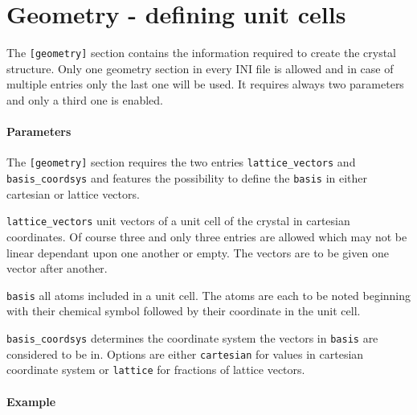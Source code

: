 \section{Geometry - defining unit cells} 
The \lstinline{[geometry]} section contains the information required to create the crystal structure. Only one geometry section in every INI file is allowed and in case of multiple entries only the last one will be used. It requires always two parameters and only a third one is enabled.

\paragraph{Parameters}
The \lstinline{[geometry]} section requires the two entries \lstinline{lattice_vectors} and \lstinline{basis_coordsys} and features the possibility to define the \lstinline{basis} in either cartesian or lattice vectors.

\begin{description}
 \item{\lstinline{lattice_vectors}} unit vectors of a unit cell of the crystal in cartesian coordinates. Of course three and only three entries are allowed which may not be linear dependant upon one another or empty. The vectors are to be given one vector after another.
 \item{\lstinline{basis}} all atoms included in a unit cell. The atoms are each to be noted beginning with their chemical symbol followed by their coordinate in the unit cell.
 \item{\lstinline{basis_coordsys}} determines the coordinate system the vectors in \lstinline{basis} are considered to be in. Options are either \lstinline{cartesian} for values in cartesian coordinate system or \lstinline{lattice} for fractions of lattice vectors.
\end{description}

\paragraph{Example}\


